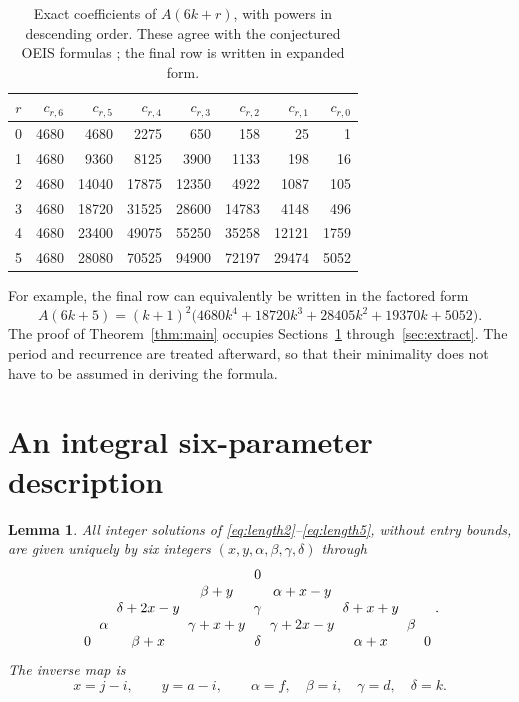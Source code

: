\documentclass[11pt]{article}
\numberwithin{equation}{section}
\newtheorem{lemma}[theorem]{Lemma}
\theoremstyle{definition}
\begin{document}
\begin{table}[htbp]
\centering
\small
\setlength{\tabcolsep}{5pt}
\begin{tabular}{crrrrrrr}
\toprule
$r$&$c_{r,6}$&$c_{r,5}$&$c_{r,4}$&$c_{r,3}$&$c_{r,2}$&$c_{r,1}$&$c_{r,0}$\\
\midrule
0&4680&4680&2275&650&158&25&1\\
1&4680&9360&8125&3900&1133&198&16\\
2&4680&14040&17875&12350&4922&1087&105\\
3&4680&18720&31525&28600&14783&4148&496\\
4&4680&23400&49075&55250&35258&12121&1759\\
5&4680&28080&70525&94900&72197&29474&5052\\
\bottomrule
\end{tabular}
\caption{Exact coefficients of $A(6k+r)$, with powers in descending order.
These agree with the conjectured OEIS formulas \cite{oeis}; the final row is
written in expanded form.}
\label{tab:residues}
\end{table}

For example, the final row can equivalently be written in the factored form
\begin{equation}\label{eq:lastresidue}
 A(6k+5)=(k+1)^2
 \bigl(4680k^4+18720k^3+28405k^2+19370k+5052\bigr).
\end{equation}
The proof of Theorem~\ref{thm:main} occupies Sections~\ref{sec:param}
through~\ref{sec:extract}. The period and recurrence are treated afterward,
so that their minimality does not have to be assumed in deriving the formula.

\section{An integral six-parameter description}
\label{sec:param}

\begin{lemma}\label{lem:param}
All integer solutions of \eqref{eq:length2}--\eqref{eq:length5}, without entry
bounds, are given uniquely by six integers
$(x,y,\alpha,\beta,\gamma,\delta)$ through
\begin{equation}\label{eq:paramarray}
\setlength{\arraycolsep}{3pt}
\begin{array}{ccccccccc}
&&&&0&&&&\\
&&&\beta+y&&\alpha+x-y&&&\\
&&\delta+2x-y&&\gamma&&\delta+x+y&&\\
&\alpha&&\gamma+x+y&&\gamma+2x-y&&\beta&\\
0&&\beta+x&&\delta&&\alpha+x&&0
\end{array}.
\end{equation}
The inverse map is
\begin{equation}\label{eq:inverse}
x=j-i,\qquad y=a-i,\qquad
\alpha=f,\quad\beta=i,\quad\gamma=d,\quad\delta=k.
\end{equation}
\end{lemma}
\end{document}
